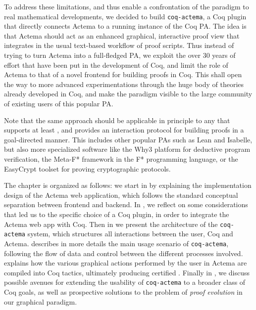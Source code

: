 To address these limitations, and thus enable a confrontation of the
 paradigm to real mathematical developments, we decided to build
\texttt{coq-actema}, a Coq plugin that directly connects Actema to a running
instance of the Coq PA. The idea is that Actema should act as an enhanced
graphical, interactive proof view that integrates in the usual text-based
workflow of proof scripts. Thus instead of trying to turn Actema into a
full-fledged PA, we exploit the over 30 years of effort that have been put in
the development of Coq, and limit the role of Actema to that of a novel frontend
for building proofs in Coq. This shall open the way to more advanced
experimentations through the huge body of theories already developed in Coq, and
make the  paradigm visible to the large community of existing
users of this popular PA.

Note that the same approach should be applicable in principle to any  that
supports at least , and provides an interaction protocol for building proofs
in a goal-directed manner. This includes other popular PAs such as Lean and
Isabelle, but also more specialized software like the Why3 platform for
deductive program verification, the Meta-F* framework in the F* programming
language, or the EasyCrypt toolset for proving cryptographic protocols.


The chapter is organized as follows: we start in  by explaining
the implementation design of the Actema web application, which follows the
standard conceptual separation between frontend and backend. In
, we reflect on some considerations that led us to the
specific choice of a Coq plugin, in order to integrate the Actema web app with
Coq. Then in  we present the architecture of the
\texttt{coq-actema} system, which structures all interactions between the user,
Coq and Actema.  describes in more details the main usage
scenario of \texttt{coq-actema}, following the flow of data and control between
the different processes involved.  explains how the various
graphical actions performed by the user in Actema are compiled into Coq tactics,
ultimately producing certified . Finally in , we
discuss possible avenues for extending the usability of \texttt{coq-actema} to a
broader class of Coq goals, as well as prospective solutions to the problem of
\emph{proof evolution} in our graphical paradigm.

